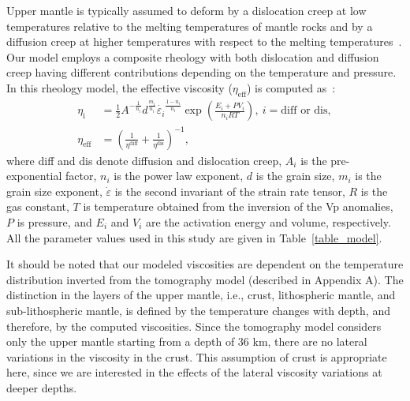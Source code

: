 \documentclass[draft,linenumbers]{agujournal2018}
\begin{document}
Upper mantle is typically assumed to deform by a dislocation creep at low temperatures relative to the melting temperatures of mantle rocks and by a diffusion creep at higher temperatures with respect to the melting temperatures~\citep[e.g.,][]{gordon1967thermally}. Our model employs a composite rheology with both dislocation and diffusion creep having different contributions depending on the temperature and pressure. In this rheology model, the effective viscosity ($\eta_{\text{eff}}$) is computed as~\citep{billen2007rheologic}:
%
\begin{align}
    \eta_{\text{i}} &= \frac{1}{2} A^{-\frac{1}{n_i}} d^\frac{m_i}{n_i} \dot{\varepsilon_i}^{\frac{1-n_i}{n_i}} \exp\left(\frac{E_i + PV_i}{n_iRT}\right),\ i=\text{diff or dis}, \\
    \eta_{\text{eff}} &= \left(\frac{1}{\eta^\text{diff}} + \frac{1}{\eta^\text{dis}}\right)^{-1},
\end{align}
%
where diff and dis denote diffusion and dislocation creep, $A_i$ is the pre-exponential factor, $n_i$ is the power law exponent, $d$ is the grain size, $m_i$ is the grain size exponent, $\dot{\varepsilon}$ is the second invariant of the strain rate tensor, $R$ is the gas constant, $T$ is temperature obtained from the inversion of the Vp anomalies, $P$ is pressure, and $E_i$ and $V_i$ are the activation energy and volume, respectively. All the parameter values used in this study are given in Table~\ref{table_model}.

It should be noted that our modeled viscosities are dependent on the temperature distribution inverted from the tomography model (described in Appendix A). The distinction in the layers of the upper mantle, i.e., crust, lithospheric mantle, and sub-lithospheric mantle, is defined by the temperature changes with depth, and therefore, by the computed viscosities. Since the tomography model considers only the upper mantle starting from a depth of 36 km, there are no lateral variations in the viscosity in the crust. This assumption of crust is appropriate here, since we are interested in the effects of the lateral viscosity variations at deeper depths.  
\end{document}
